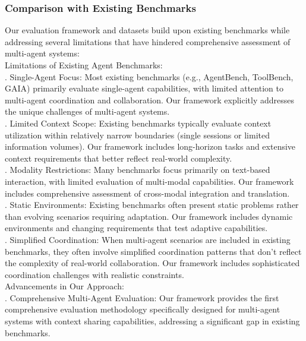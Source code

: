 \subsubsection{Comparison with Existing Benchmarks}
Our evaluation framework and datasets build upon existing benchmarks while addressing several limitations that have hindered comprehensive assessment of multi-agent systems:\\ \newline
Limitations of Existing Agent Benchmarks:\\ . Single-Agent Focus: Most existing benchmarks (e.g., AgentBench, ToolBench, GAIA) primarily evaluate single-agent capabilities, with limited attention to multi-agent coordination and collaboration. Our framework explicitly addresses the unique challenges of multi-agent systems.\\ . Limited Context Scope: Existing benchmarks typically evaluate context utilization within relatively narrow boundaries (single sessions or limited information volumes). Our framework includes long-horizon tasks and extensive context requirements that better reflect real-world complexity.\\ . Modality Restrictions: Many benchmarks focus primarily on text-based interaction, with limited evaluation of multi-modal capabilities. Our framework includes comprehensive assessment of cross-modal integration and translation.\\ . Static Environments: Existing benchmarks often present static problems rather than evolving scenarios requiring adaptation. Our framework includes dynamic environments and changing requirements that test adaptive capabilities.\\ . Simplified Coordination: When multi-agent scenarios are included in existing benchmarks, they often involve simplified coordination patterns that don't reflect the complexity of real-world collaboration. Our framework includes sophisticated coordination challenges with realistic constraints.\\ \newline
Advancements in Our Approach:\\ . Comprehensive Multi-Agent Evaluation: Our framework provides the first comprehensive evaluation methodology specifically designed for multi-agent systems with context sharing capabilities, addressing a significant gap in existing benchmarks.\\ \newline
